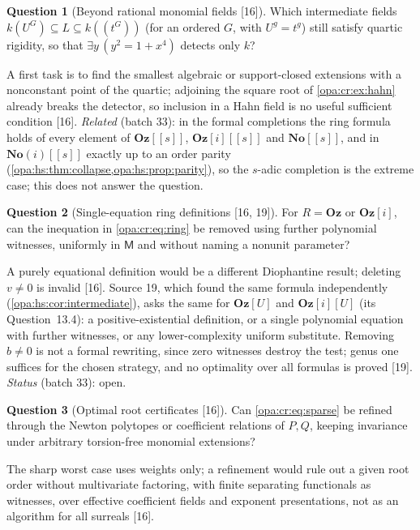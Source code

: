 \documentclass[11pt,oneside]{article}
\numberwithin{equation}{section}
\theoremstyle{definition}
\newtheorem{question}[question]{Question}
\theoremstyle{remark}
\newcommand{\No}{\mathbf{No}}
\newcommand{\Oz}{\mathbf{Oz}}
\newcommand{\Og}{\mathbf{Oz}[i]}
\newcommand{\SC}{\mathbf{No}(i)}
\newcommand{\Hahn}[2]{#1((t^{#2}))}
\newcommand{\src}[1]{\textup{\textsf{\small[#1]}}}
\begin{document}
\begin{question}[Beyond rational monomial fields \src{16}]\label{opa:cr:q:hahn}
Which intermediate fields $k(U^G)\subseteq L\subseteq\Hahn kG$ (for an ordered $G$, with $U^g=t^g$) still satisfy quartic
rigidity, so that
$\exists y\,(y^2=1+x^4)$ detects only $k$?
\end{question}
A first task is to find the smallest algebraic or support-closed extensions with a nonconstant point of the quartic;
adjoining the square root of \cref{opa:cr:ex:hahn} already breaks the detector, so inclusion in a Hahn field is no useful
sufficient condition \src{16}. \emph{Related} (batch 33): in the formal completions the ring formula holds of every element of
$\Oz[[s]]$, $\Og[[s]]$ and $\No[[s]]$, and in $\SC[[s]]$ exactly up to an order parity (\cref{opa:hs:thm:collapse,opa:hs:prop:parity}),
so the $s$-adic completion is the extreme case; this does not answer the question.

\begin{question}[Single-equation ring definitions \src{16, 19}]\label{opa:cr:q:equational}
For $R=\Oz$ or $\Og$, can the inequation in \eqref{opa:cr:eq:ring} be removed using further polynomial witnesses, uniformly in
$\mathsf M$ and without naming a nonunit parameter?
\end{question}
A purely equational definition would be a different Diophantine result; deleting $v\ne0$ is invalid \src{16}. Source 19, which
found the same formula independently (\cref{opa:hs:cor:intermediate}), asks the same for $\Oz[U]$ and $\Og[U]$ (its
Question~13.4): a positive-existential definition, or a single polynomial equation with further witnesses, or any
lower-complexity uniform substitute. Removing $b\ne0$ is not a formal rewriting, since zero witnesses destroy the test; genus
one suffices for the chosen strategy, and no optimality over all formulas is proved \src{19}. \emph{Status} (batch 33): open.

\begin{question}[Optimal root certificates \src{16}]\label{opa:cr:q:certificates}
Can \eqref{opa:cr:eq:sparse} be refined through the Newton polytopes or coefficient relations of $P,Q$, keeping invariance under
arbitrary torsion-free monomial extensions?
\end{question}
The sharp worst case uses weights only; a refinement would rule out a given root order without multivariate factoring, with
finite separating functionals as witnesses, over effective coefficient fields and exponent presentations, not as an algorithm
for all surreals \src{16}.
\end{document}
